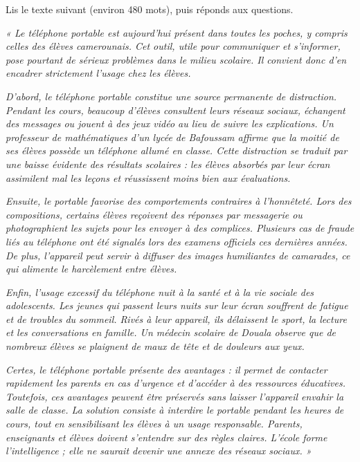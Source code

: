 \documentclass[11pt]{article}
\newcounter{popsec}
\newcounter{popsub}
\newcommand{\courssub}[1]{%
  \stepcounter{popsub}%
  \par\vspace{9pt}\noindent{\popxbold\fontsize{11.5}{13}\selectfont\color{popink}{\color{poporange}\thepopsec.\thepopsub}\hspace{6pt}#1}\par\nopagebreak\vspace{4pt}
}
\begin{document}
\courssub{Je me prépare au Bac}

\begin{exercice}
Lis le texte suivant (environ 480 mots), puis réponds aux questions.

\emph{« Le téléphone portable est aujourd'hui présent dans toutes les poches, y compris celles des élèves camerounais. Cet outil, utile pour communiquer et s'informer, pose pourtant de sérieux problèmes dans le milieu scolaire. Il convient donc d'en encadrer strictement l'usage chez les élèves.}

\emph{D'abord, le téléphone portable constitue une source permanente de distraction. Pendant les cours, beaucoup d'élèves consultent leurs réseaux sociaux, échangent des messages ou jouent à des jeux vidéo au lieu de suivre les explications. Un professeur de mathématiques d'un lycée de Bafoussam affirme que la moitié de ses élèves possède un téléphone allumé en classe. Cette distraction se traduit par une baisse évidente des résultats scolaires : les élèves absorbés par leur écran assimilent mal les leçons et réussissent moins bien aux évaluations.}

\emph{Ensuite, le portable favorise des comportements contraires à l'honnêteté. Lors des compositions, certains élèves reçoivent des réponses par messagerie ou photographient les sujets pour les envoyer à des complices. Plusieurs cas de fraude liés au téléphone ont été signalés lors des examens officiels ces dernières années. De plus, l'appareil peut servir à diffuser des images humiliantes de camarades, ce qui alimente le harcèlement entre élèves.}

\emph{Enfin, l'usage excessif du téléphone nuit à la santé et à la vie sociale des adolescents. Les jeunes qui passent leurs nuits sur leur écran souffrent de fatigue et de troubles du sommeil. Rivés à leur appareil, ils délaissent le sport, la lecture et les conversations en famille. Un médecin scolaire de Douala observe que de nombreux élèves se plaignent de maux de tête et de douleurs aux yeux.}

\emph{Certes, le téléphone portable présente des avantages : il permet de contacter rapidement les parents en cas d'urgence et d'accéder à des ressources éducatives. Toutefois, ces avantages peuvent être préservés sans laisser l'appareil envahir la salle de classe. La solution consiste à interdire le portable pendant les heures de cours, tout en sensibilisant les élèves à un usage responsable. Parents, enseignants et élèves doivent s'entendre sur des règles claires. L'école forme l'intelligence ; elle ne saurait devenir une annexe des réseaux sociaux. »}


\end{exercice}
\end{document}
